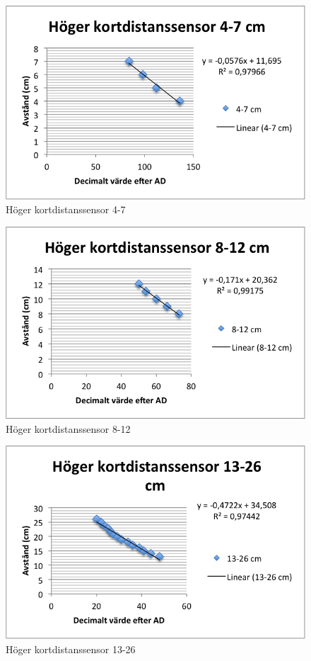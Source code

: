 \begin{figure}[H]
  \centering
 \includegraphics[angle=0,scale=1]{bilder/H_K_4_7png.png}
  \caption{Höger kortdistanssensor 4-7}
\end{figure}

\begin{figure}[H]
  \centering
 \includegraphics[angle=0,scale=1]{bilder/H_K_8_12.png}
  \caption{Höger kortdistanssensor 8-12}
\end{figure}

\begin{figure}[H]
  \centering
 \includegraphics[angle=0,scale=1]{bilder/H_K_13_26.png}
  \caption{Höger kortdistanssensor 13-26}
\end{figure}

